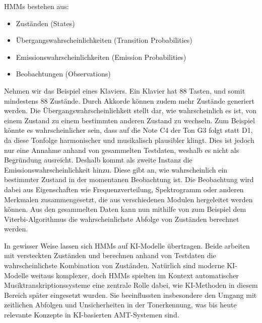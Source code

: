 HMMs bestehen aus:
\begin{itemize}
    \item Zuständen (States)
    \item Übergangswahrscheinlichkeiten (Transition Probabilities)
    \item Emissionswahrscheinlichkeiten (Emission Probabilities)
    \item Beobachtungen (Observations)
\end{itemize}
Nehmen wir das Beispiel eines Klaviers.
Ein Klavier hat 88 Tasten, und somit mindestens 88 Zustände.
Durch Akkorde können zudem mehr Zustände generiert werden.
Die Übergangswahrscheinlichkeit stellt dar,
wie wahrscheinlich es ist, von einem Zustand zu einem bestimmten anderen Zustand zu wechseln.
Zum Beispiel könnte es wahrscheinlicher sein, dass auf die Note C4 der Ton G3 folgt statt D1,
da diese Tonfolge harmonischer und musikalisch plausibler klingt.
Dies ist jedoch nur eine Annahme anhand von gesammelten Testdaten, weshalb es nicht als Begründung ausreicht.
Deshalb kommt als zweite Instanz die Emissionswahrscheinlichkeit hinzu.
Diese gibt an, wie wahrscheinlich ein bestimmter Zustand in der momentanen Beobachtung ist.
Die Beobachtung wird dabei aus Eigenschaften wie Frequenzverteilung,
Spektrogramm oder anderen Merkmalen zusammengesetzt, die aus verschiedenen Modulen hergeleitet werden können.
Aus den gesammelten Daten kann nun mithilfe von zum Beispiel dem Viterbi-Algorithmus \cite{takeda2002hidden} die
wahrscheinlichste Abfolge von Zuständen berechnet werden.

In gewisser Weise lassen sich HMMs auf KI-Modelle übertragen.
Beide arbeiten mit versteckten Zuständen und
berechnen anhand von Testdaten die wahrscheinlichste Kombination von Zuständen.
Natürlich sind moderne KI-Modelle weitaus komplexer,
doch HMMs spielten im Kontext automatischer Musiktranskriptionssysteme eine zentrale Rolle dabei,
wie KI-Methoden in diesem Bereich später eingesetzt wurden.
Sie beeinflussten insbesondere den Umgang mit zeitlichen Abfolgen
und Unsicherheiten in der Tonerkennung,
was bis heute relevante Konzepte in KI-basierten AMT-Systemen sind.

